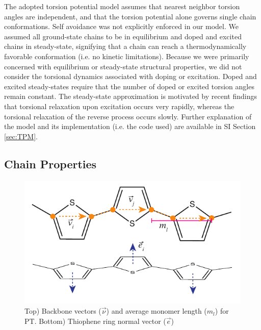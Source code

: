 The adopted torsion potential model assumes that nearest neighbor torsion angles are independent, and that the torsion potential alone governs single chain conformations. Self avoidance was not explicitly enforced in our model. We assumed all ground-state chains to be in equilibrium and doped and excited chains in steady-state, signifying that a chain can reach a thermodynamically favorable conformation (i.e. no kinetic limitations). Because we were primarily concerned with equilibrium or steady-state structural properties, we did not consider the torsional dynamics associated with doping or excitation. Doped and excited steady-states require that the number of doped or excited torsion angles remain constant. The steady-state approximation is motivated by recent findings that torsional relaxation upon excitation occurs very rapidly, whereas the torsional relaxation of the reverse process occurs slowly.\cite{Busby2011, Yu2016} Further explanation of the model and its implementation (i.e. the code used) are available in SI Section \ref{sec:TPM}.

\subsection*{Chain Properties}

\begin{figure}
    \centering
    \includegraphics{figures/chap2/bond_vectors.pdf}
    \caption{Top) Backbone vectors ($\Vec{\nu}$) and average monomer length ($m_l$) for PT. Bottom) Thiophene ring normal vector ($\Vec{e}$)}
    \label{fig:pt_vecs}
\end{figure}


